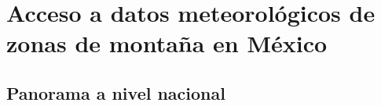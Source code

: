 






























\section{Acceso a datos meteorológicos de zonas de montaña en México}



\subsection{Panorama a nivel nacional}

